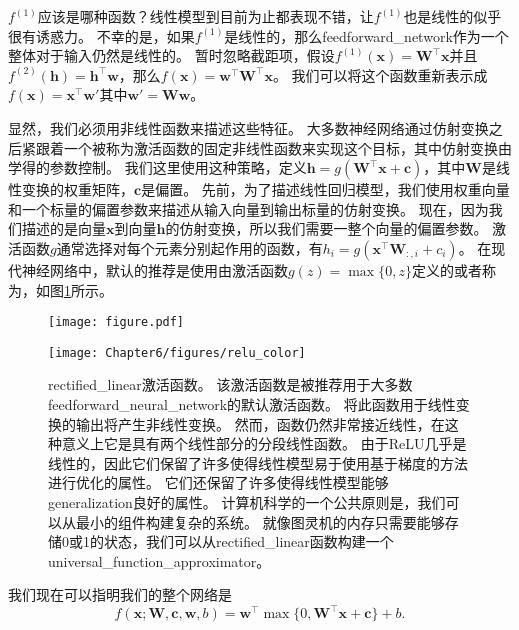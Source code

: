$f^{(1)}$应该是哪种函数？线性模型到目前为止都表现不错，让$f^{(1)}$也是线性的似乎很有诱惑力。
不幸的是，如果$f^{(1)}$是线性的，那么\gls{feedforward_network}作为一个整体对于输入仍然是线性的。
暂时忽略截距项，假设$f^{(1)}(\bm{x})= \bm{W}^\top \bm{x}$并且$f^{(2)}(\bm{h})=\bm{h}^\top \bm{w}$，那么$f(\bm{x}) = \bm{w}^\top\bm{W}^\top \bm{x}$。
我们可以将这个函数重新表示成$f(\bm{x}) = \bm{x}^\top\bm{w}'$其中$\bm{w}' = \bm{W}\bm{w}$。


显然，我们必须用非线性函数来描述这些特征。
大多数神经网络通过仿射变换之后紧跟着一个被称为激活函数的固定非线性函数来实现这个目标，其中仿射变换由学得的参数控制。
我们这里使用这种策略，定义$\bm{h}=g(\bm{W}^\top \bm{x}+\bm{c})$，其中$\bm{W}$是线性变换的权重矩阵，$\bm{c}$是偏置。
先前，为了描述线性回归模型，我们使用权重向量和一个标量的偏置参数来描述从输入向量到输出标量的仿射变换。
现在，因为我们描述的是向量$\bm{x}$到向量$\bm{h}$的仿射变换，所以我们需要一整个向量的偏置参数。
激活函数$g$通常选择对每个元素分别起作用的函数，有$h_i =g(\bm{x}^\top \bm{W}_{:, i} + c_i)$。
在现代神经网络中，默认的推荐是使用由激活函数$g(z)=\max\{0, z\}$定义的或者称为\citep{Jarrett-ICCV2009-small,Nair-2010-small,Glorot+al-AI-2011-small}，如图\ref{fig:chap6_relu_color}所示。
\begin{figure}[!htb]
\ifOpenSource
\centerline{\texttt{[image: figure.pdf]}}
\else
\centerline{\texttt{[image: Chapter6/figures/relu\_color]}}
\fi
\caption{\gls{rectified_linear}激活函数。
该激活函数是被推荐用于大多数\gls{feedforward_neural_network}的默认激活函数。
将此函数用于线性变换的输出将产生非线性变换。 然而，函数仍然非常接近线性，在这种意义上它是具有两个线性部分的分段线性函数。
由于\gls{ReLU}几乎是线性的，因此它们保留了许多使得线性模型易于使用基于梯度的方法进行优化的属性。 它们还保留了许多使得线性模型能够\gls{generalization}良好的属性。 计算机科学的一个公共原则是，我们可以从最小的组件构建复杂的系统。
就像图灵机的内存只需要能够存储0或1的状态，我们可以从\gls{rectified_linear}函数构建一个\gls{universal_function_approximator}。}
\label{fig:chap6_relu_color}
\end{figure}


我们现在可以指明我们的整个网络是
\begin{equation}
f(\bm{x}; \bm{W}, \bm{c}, \bm{w}, b) = \bm{w}^\top \max\{ 0, \bm{W}^\top \bm{x} + \bm{c} \} +b.
\end{equation}



